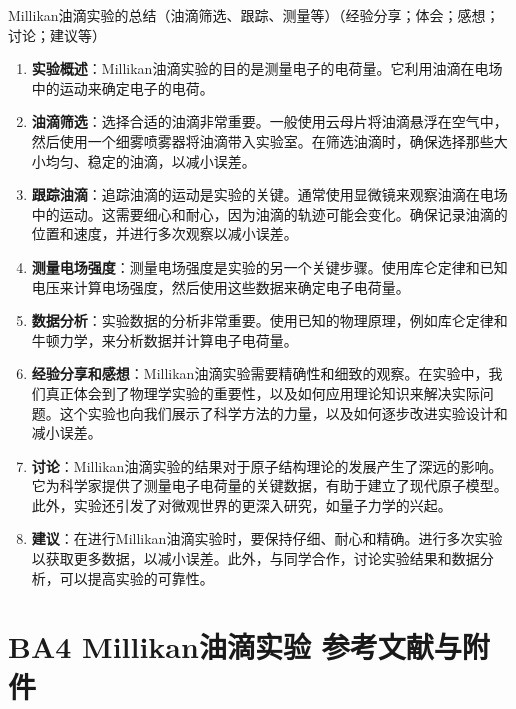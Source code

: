 \documentclass[dvipsnames, svgnames,a4paper,11pt]{article}
\begin{document}
	\begin{question}
		Millikan油滴实验的总结（油滴筛选、跟踪、测量等）（经验分享；体会；感想；讨论；建议等）
	\end{question}
	\begin{enumerate}
		\item \textbf{实验概述}：Millikan油滴实验的目的是测量电子的电荷量。它利用油滴在电场中的运动来确定电子的电荷。
		
		\item \textbf{油滴筛选}：选择合适的油滴非常重要。一般使用云母片将油滴悬浮在空气中，然后使用一个细雾喷雾器将油滴带入实验室。在筛选油滴时，确保选择那些大小均匀、稳定的油滴，以减小误差。
		
		\item \textbf{跟踪油滴}：追踪油滴的运动是实验的关键。通常使用显微镜来观察油滴在电场中的运动。这需要细心和耐心，因为油滴的轨迹可能会变化。确保记录油滴的位置和速度，并进行多次观察以减小误差。
		
		\item \textbf{测量电场强度}：测量电场强度是实验的另一个关键步骤。使用库仑定律和已知电压来计算电场强度，然后使用这些数据来确定电子电荷量。
		
		\item \textbf{数据分析}：实验数据的分析非常重要。使用已知的物理原理，例如库仑定律和牛顿力学，来分析数据并计算电子电荷量。
		
		\item \textbf{经验分享和感想}：Millikan油滴实验需要精确性和细致的观察。在实验中，我们真正体会到了物理学实验的重要性，以及如何应用理论知识来解决实际问题。这个实验也向我们展示了科学方法的力量，以及如何逐步改进实验设计和减小误差。
		
		\item \textbf{讨论}：Millikan油滴实验的结果对于原子结构理论的发展产生了深远的影响。它为科学家提供了测量电子电荷量的关键数据，有助于建立了现代原子模型。此外，实验还引发了对微观世界的更深入研究，如量子力学的兴起。
		
		\item \textbf{建议}：在进行Millikan油滴实验时，要保持仔细、耐心和精确。进行多次实验以获取更多数据，以减小误差。此外，与同学合作，讨论实验结果和数据分析，可以提高实验的可靠性。
	\end{enumerate}
	
	
	
	\clearpage
	\section{BA4 Millikan油滴实验 \quad\heiti 参考文献与附件}
\end{document}
